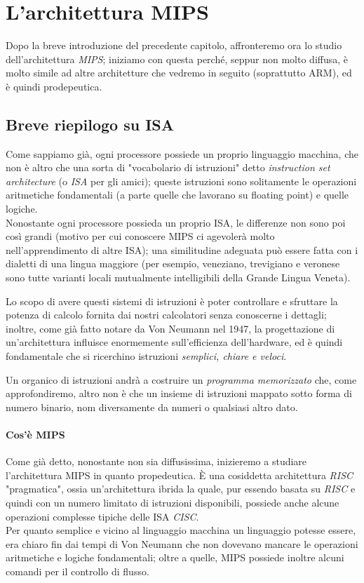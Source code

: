 \documentclass[class=book, crop=false]{standalone}
\begin{document}
\chapter{L'architettura MIPS}

Dopo la breve introduzione del precedente capitolo, affronteremo ora lo studio dell'architettura \emph{MIPS}; iniziamo con questa perché, seppur non molto diffusa, è molto simile ad altre architetture che vedremo in seguito (soprattutto ARM), ed è quindi prodepeutica.

\section{Breve riepilogo su ISA}
Come sappiamo già, ogni processore possiede un proprio linguaggio macchina, che non è altro che una sorta di "vocabolario di istruzioni" detto \emph{instruction set architecture} (o \emph{ISA} per gli amici); queste istruzioni sono solitamente le operazioni aritmetiche fondamentali (a parte quelle che lavorano su floating point) e quelle logiche.\\
Nonostante ogni processore possieda un proprio ISA, le differenze non sono poi così grandi (motivo per cui conoscere MIPS ci agevolerà molto nell'apprendimento di altre ISA); una similitudine adeguata può essere fatta con i dialetti di una lingua maggiore (per esempio, veneziano, trevigiano e veronese sono tutte varianti locali mutualmente intelligibili della Grande Lingua Veneta).

Lo scopo di avere questi sistemi di istruzioni è poter controllare e sfruttare la potenza di calcolo fornita dai nostri calcolatori senza conoscerne i dettagli; inoltre, come già fatto notare da Von Neumann nel 1947, la progettazione di un'architettura influisce enormemente sull'efficienza dell'hardware, ed è quindi fondamentale che si ricerchino istruzioni \emph{semplici, chiare e veloci}.

Un organico di istruzioni andrà a costruire un \emph{programma memorizzato} che, come approfondiremo, altro non è che un insieme di istruzioni mappato sotto forma di numero binario, nom diversamente da numeri o qualsiasi altro dato.

\subsubsection{Cos'è MIPS}
Come già detto, nonostante non sia diffusissima, inizieremo a studiare l'architettura MIPS in quanto propedeutica. È una cosiddetta architettura \emph{RISC} "pragmatica", ossia un'architettura ibrida la quale, pur essendo basata su \emph{RISC} e quindi con un numero limitato di istruzioni disponibili, possiede anche alcune operazioni complesse tipiche delle ISA \emph{CISC}.\\
Per quanto semplice e vicino al linguaggio macchina un linguaggio potesse essere, era chiaro fin dai tempi di Von Neumann che non dovevano mancare le operazioni aritmetiche e logiche fondamentali; oltre a quelle, MIPS possiede inoltre alcuni comandi per il controllo di flusso.
\end{document}
